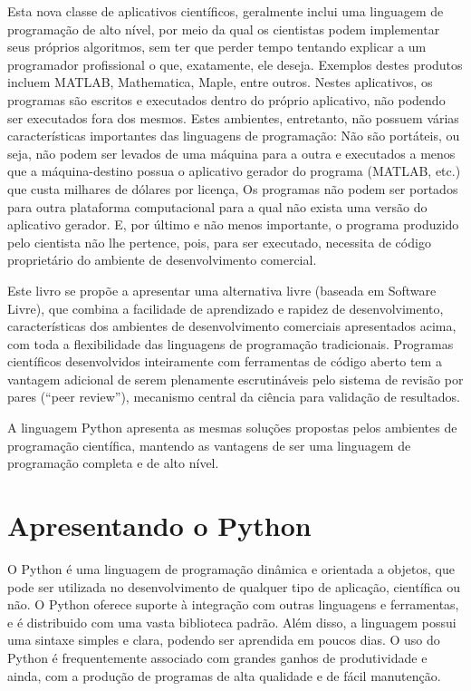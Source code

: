 \documentclass[a4paper,10pt,portuguese]{sphinxmanual}
\begin{document}
Esta nova classe de aplicativos científicos, geralmente inclui uma linguagem de programação de alto nível, por meio da qual os cientistas podem implementar seus próprios algoritmos, sem ter que perder tempo tentando explicar a um programador profissional o que, exatamente, ele deseja. Exemplos destes produtos incluem MATLAB, Mathematica, Maple, entre outros. Nestes aplicativos, os programas são escritos e executados dentro do próprio aplicativo, não podendo ser executados fora dos mesmos. Estes ambientes, entretanto, não possuem várias características importantes das linguagens de programação: Não são portáteis, ou seja, não podem ser levados de uma máquina para a outra e executados a menos que a máquina-destino possua o aplicativo gerador do programa (MATLAB, etc.) que custa milhares de dólares por licença, Os programas não podem ser portados para outra plataforma computacional para a qual não exista uma versão do aplicativo gerador. E, por último e não menos importante, o programa produzido pelo cientista não lhe pertence, pois, para ser executado, necessita de código proprietário do ambiente de desenvolvimento comercial.

Este livro se propõe a apresentar uma alternativa livre (baseada em Software Livre), que combina a facilidade de aprendizado e rapidez de desenvolvimento, características dos ambientes de desenvolvimento comerciais apresentados acima, com toda a flexibilidade das linguagens de programação tradicionais. Programas científicos desenvolvidos inteiramente com ferramentas de código aberto tem a vantagem adicional de serem plenamente escrutináveis pelo sistema de revisão por pares (``peer review''), mecanismo central da ciência para validação de resultados.

A linguagem Python apresenta as mesmas soluções propostas pelos ambientes de programação científica, mantendo as vantagens de ser uma linguagem de programação completa e de alto nível.


\section{Apresentando o Python}
\label{Cap1:apresentando-o-python}
O Python é uma linguagem de programação dinâmica e orientada a objetos, que pode ser utilizada no desenvolvimento de qualquer tipo de aplicação, científica ou não. O Python oferece suporte à integração com outras linguagens e ferramentas, e é distribuido com uma vasta biblioteca padrão. Além disso, a linguagem possui uma sintaxe simples e clara, podendo ser aprendida em poucos dias. O uso do Python é frequentemente associado com grandes ganhos de produtividade e ainda, com a produção de programas de alta qualidade e de fácil manutenção.
\end{document}
